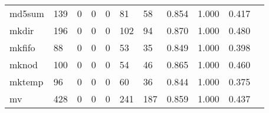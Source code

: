 \begin{longtable}{lp{1.2cm}p{1.2cm}p{1.2cm}p{1.2cm}p{1.2cm}p{1.2cm}p{1.2cm}p{1.2cm}p{1.2cm}p{1.2cm}}
md5sum    &                                   139 &                                                  0 &                                                  0 &                                                  0 &                                                 81 &                                                 58 &                                         0.854 &                                              1.000 &                                              0.417 \\
mkdir     &                                   196 &                                                  0 &                                                  0 &                                                  0 &                                                102 &                                                 94 &                                         0.870 &                                              1.000 &                                              0.480 \\
mkfifo    &                                    88 &                                                  0 &                                                  0 &                                                  0 &                                                 53 &                                                 35 &                                         0.849 &                                              1.000 &                                              0.398 \\
mknod     &                                   100 &                                                  0 &                                                  0 &                                                  0 &                                                 54 &                                                 46 &                                         0.865 &                                              1.000 &                                              0.460 \\
mktemp    &                                    96 &                                                  0 &                                                  0 &                                                  0 &                                                 60 &                                                 36 &                                         0.844 &                                              1.000 &                                              0.375 \\
mv        &                                   428 &                                                  0 &                                                  0 &                                                  0 &                                                241 &                                                187 &                                         0.859 &                                              1.000 &                                              0.437 \\

\end{longtable}
